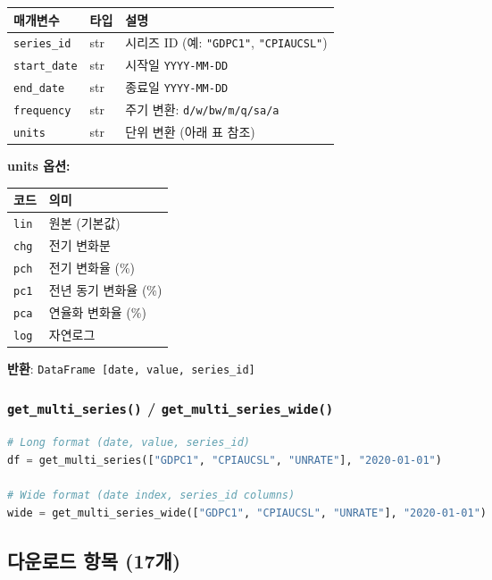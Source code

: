 \documentclass[11pt,a4paper]{article}
\newcommand{\param}[1]{\texttt{\textcolor{keyword}{#1}}}
\newcommand{\code}[1]{\texttt{#1}}
\begin{document}
\begin{table}[h]
\centering
\begin{tabularx}{\textwidth}{l l X}
\toprule
\textbf{매개변수} & \textbf{타입} & \textbf{설명} \\
\midrule
\param{series\_id} & str & 시리즈 ID (예: \code{"GDPC1"}, \code{"CPIAUCSL"}) \\
\param{start\_date} & str & 시작일 \code{YYYY-MM-DD} \\
\param{end\_date} & str & 종료일 \code{YYYY-MM-DD} \\
\param{frequency} & str & 주기 변환: \code{d/w/bw/m/q/sa/a} \\
\param{units} & str & 단위 변환 (아래 표 참조) \\
\bottomrule
\end{tabularx}
\end{table}

\textbf{units 옵션:}
\begin{table}[h]
\centering
\begin{tabular}{l l}
\toprule
\textbf{코드} & \textbf{의미} \\
\midrule
\code{lin} & 원본 (기본값) \\
\code{chg} & 전기 변화분 \\
\code{pch} & 전기 변화율 (\%) \\
\code{pc1} & 전년 동기 변화율 (\%) \\
\code{pca} & 연율화 변화율 (\%) \\
\code{log} & 자연로그 \\
\bottomrule
\end{tabular}
\end{table}

\textbf{반환}: \code{DataFrame [date, value, series\_id]}

\subsubsection{\code{get\_multi\_series()} / \code{get\_multi\_series\_wide()}}

\begin{lstlisting}[language=Python]
# Long format (date, value, series_id)
df = get_multi_series(["GDPC1", "CPIAUCSL", "UNRATE"], "2020-01-01")

# Wide format (date index, series_id columns)
wide = get_multi_series_wide(["GDPC1", "CPIAUCSL", "UNRATE"], "2020-01-01")
\end{lstlisting}

\subsection{다운로드 항목 (17개)}
\end{document}
